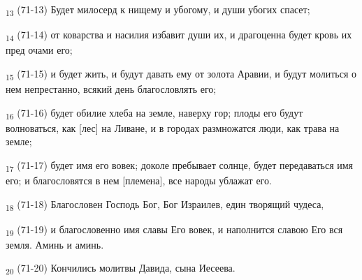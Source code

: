 \begin{tcolorbox}
\textsubscript{13} (71-13) Будет милосерд к нищему и убогому, и души убогих спасет;
\end{tcolorbox}
\begin{tcolorbox}
\textsubscript{14} (71-14) от коварства и насилия избавит души их, и драгоценна будет кровь их пред очами его;
\end{tcolorbox}
\begin{tcolorbox}
\textsubscript{15} (71-15) и будет жить, и будут давать ему от золота Аравии, и будут молиться о нем непрестанно, всякий день благословлять его;
\end{tcolorbox}
\begin{tcolorbox}
\textsubscript{16} (71-16) будет обилие хлеба на земле, наверху гор; плоды его будут волноваться, как [лес] на Ливане, и в городах размножатся люди, как трава на земле;
\end{tcolorbox}
\begin{tcolorbox}
\textsubscript{17} (71-17) будет имя его вовек; доколе пребывает солнце, будет передаваться имя его; и благословятся в нем [племена], все народы ублажат его.
\end{tcolorbox}
\begin{tcolorbox}
\textsubscript{18} (71-18) Благословен Господь Бог, Бог Израилев, един творящий чудеса,
\end{tcolorbox}
\begin{tcolorbox}
\textsubscript{19} (71-19) и благословенно имя славы Его вовек, и наполнится славою Его вся земля. Аминь и аминь.
\end{tcolorbox}
\begin{tcolorbox}
\textsubscript{20} (71-20) Кончились молитвы Давида, сына Иесеева.
\end{tcolorbox}
